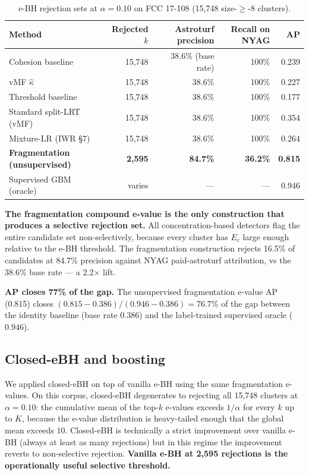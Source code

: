 \documentclass{article}
\theoremstyle{definition}
\theoremstyle{remark}
\begin{document}
\begin{table}[t]
\centering
\caption{e-BH rejection sets at $\alpha = 0.10$ on FCC 17-108 (15{,}748 size-$\ge$-8 clusters).}
\label{tab:headline}
\begin{tabular}{lrrrr}
\toprule
Method & Rejected $k$ & Astroturf precision & Recall on NYAG & AP \\
\midrule
Cohesion baseline & 15{,}748 & 38.6\% (base rate) & 100\% & 0.239 \\
vMF $\hat\kappa$ & 15{,}748 & 38.6\% & 100\% & 0.227 \\
Threshold baseline & 15{,}748 & 38.6\% & 100\% & 0.177 \\
Standard split-LRT (vMF) & 15{,}748 & 38.6\% & 100\% & 0.354 \\
Mixture-LR (IWR \S 7) & 15{,}748 & 38.6\% & 100\% & 0.264 \\
\midrule
\textbf{Fragmentation (unsupervised)} & \textbf{2{,}595} & \textbf{84.7\%} & \textbf{36.2\%} & \textbf{0.815} \\
\midrule
Supervised GBM (oracle) & varies & --- & --- & 0.946 \\
\bottomrule
\end{tabular}
\end{table}

\textbf{The fragmentation compound e-value is the only construction that produces a selective rejection set.} All concentration-based detectors flag the entire candidate set non-selectively, because every cluster has $E_c$ large enough relative to the e-BH threshold. The fragmentation construction rejects 16.5\% of candidates at 84.7\% precision against NYAG paid-astroturf attribution, vs the 38.6\% base rate --- a 2.2$\times$ lift.

\textbf{AP closes 77\% of the gap.} The unsupervised fragmentation e-value AP (0.815) closes $(0.815 - 0.386)/(0.946 - 0.386) = 76.7\%$ of the gap between the identity baseline (base rate $0.386$) and the label-trained supervised oracle ($0.946$).

\subsection{Closed-eBH and boosting}

We applied closed-eBH \citep{xfr2025} on top of vanilla e-BH using the same fragmentation e-values. On this corpus, closed-eBH degenerates to rejecting all 15{,}748 clusters at $\alpha = 0.10$: the cumulative mean of the top-$k$ e-values exceeds $1/\alpha$ for every $k$ up to $K$, because the e-value distribution is heavy-tailed enough that the global mean exceeds $10$. Closed-eBH is technically a strict improvement over vanilla e-BH (always at least as many rejections) but in this regime the improvement reverts to non-selective rejection. \textbf{Vanilla e-BH at 2{,}595 rejections is the operationally useful selective threshold.}
\end{document}
